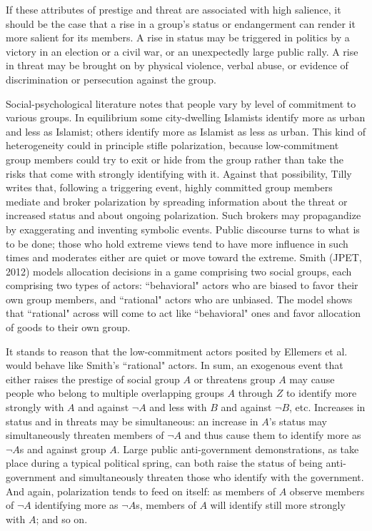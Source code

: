 \documentclass[12pt]{article}
\begin{document}
If these attributes of prestige and threat are associated with high salience, it should be the case that a rise in a group's status or endangerment can render it more salient for its members.  A rise in status may be triggered in politics by a victory in an election or a civil war, or an unexpectedly large public rally.  A rise in threat may be brought on by physical violence, verbal abuse, or evidence of discrimination or persecution against the group.

Social-psychological literature notes that people vary by level of commitment to various groups.   In equilibrium some city-dwelling Islamists identify more as urban and less as Islamist; others identify more as Islamist as less as urban.  This kind of heterogeneity could in principle stifle polarization, because low-commitment group members could try to exit or hide from the group rather than take the risks that come with strongly identifying with it.  Against that possibility, Tilly writes that, following a triggering event, highly committed group members mediate and broker polarization by spreading information about the threat or increased status and about ongoing polarization.   Such brokers may propagandize by exaggerating and inventing symbolic events.  Public discourse turns to what is to be done; those who hold extreme views tend to have more influence in such times and moderates either are quiet or move toward the extreme.   Smith (JPET, 2012) models allocation decisions in a game comprising two social groups, each comprising two types of actors:  ``behavioral" actors who are biased to favor their own group members, and ``rational" actors who are unbiased.  The model shows that ``rational" across will come to act like ``behavioral" ones and favor allocation of goods to their own group.  

It stands to reason that the low-commitment actors posited by Ellemers et al. would behave like Smith's ``rational" actors.
In sum, an exogenous event that either raises the prestige of social group $A$ or threatens group $A$ may cause people who belong to multiple overlapping groups $A$ through $Z$ to identify more strongly with $A$ and against $\neg A$ and less with $B$ and against $\neg B$, etc.  Increases in status and in threats may be simultaneous:  an increase in $A$'s status may simultaneously threaten members of $\neg A$ and thus cause them to identify more as $\neg A$s and against group $A$.  Large public anti-government demonstrations, as take place during a typical political spring, can both raise the status of being anti-government and simultaneously threaten those who identify with the government.  And again, polarization tends to feed on itself:  as members of $A$ observe members of $\neg A$ identifying more as $\neg A$s, members of $A$ will identify still more strongly with $A$; and so on. 
\end{document}
